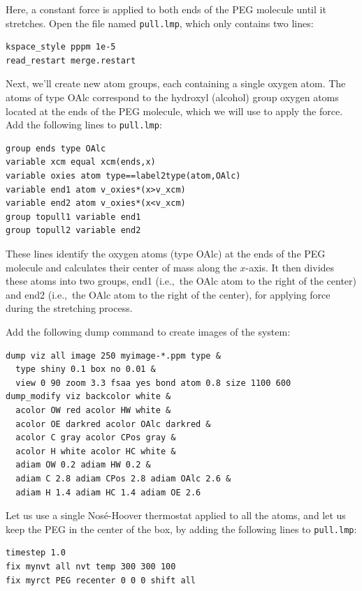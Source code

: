 \documentclass[9pt,tutorial]{livecoms}
\newcommand{\lmpcmd}[1]{\hspace{0pt}\colorbox{listing}{\textcolor{command}{\small{#1}}}\hspace{0pt}} %
\newcommand{\flecmd}[1]{\textcolor{command}{\texttt{#1}}} %
\begin{document}
Here, a constant force is applied to both ends of the PEG molecule until it
stretches.  Open the file named \flecmd{pull.lmp}, which
only contains two lines:
\begin{lstlisting}
kspace_style pppm 1e-5
read_restart merge.restart
\end{lstlisting}
Next, we'll create new atom groups, each containing a single oxygen atom.  The atoms of type OAlc
correspond to the hydroxyl (alcohol) group oxygen atoms located at the ends
of the PEG molecule, which we will use to apply the force.  Add the
following lines to \flecmd{pull.lmp}:
\begin{lstlisting}
group ends type OAlc
variable xcm equal xcm(ends,x)
variable oxies atom type==label2type(atom,OAlc)
variable end1 atom v_oxies*(x>v_xcm)
variable end2 atom v_oxies*(x<v_xcm)
group topull1 variable end1
group topull2 variable end2
\end{lstlisting}
These lines identify the oxygen atoms (type OAlc) at the ends of the PEG
molecule and calculates their center of mass along the $x$-axis.  It then
divides these atoms into two groups, \lmpcmd{end1} (i.e.,~the OAlc atom to
the right of the center) and \lmpcmd{end2} (i.e.,~the OAlc atom to the right
of the center), for applying force during the stretching process.

Add the following \lmpcmd{dump} command to create images of the system:
\begin{lstlisting}
dump viz all image 250 myimage-*.ppm type &
  type shiny 0.1 box no 0.01 &
  view 0 90 zoom 3.3 fsaa yes bond atom 0.8 size 1100 600
dump_modify viz backcolor white &
  acolor OW red acolor HW white &
  acolor OE darkred acolor OAlc darkred &
  acolor C gray acolor CPos gray &
  acolor H white acolor HC white &
  adiam OW 0.2 adiam HW 0.2 &
  adiam C 2.8 adiam CPos 2.8 adiam OAlc 2.6 &
  adiam H 1.4 adiam HC 1.4 adiam OE 2.6
\end{lstlisting}
Let us use a single Nosé-Hoover thermostat applied to all the atoms,
and let us keep the PEG in the center of the box, by adding
the following lines to \flecmd{pull.lmp}:
\begin{lstlisting}
timestep 1.0
fix mynvt all nvt temp 300 300 100
fix myrct PEG recenter 0 0 0 shift all
\end{lstlisting}
\end{document}
